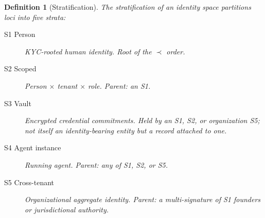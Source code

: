 \documentclass[11pt,a4paper,parskip=half-,DIV=12,headings=standardclasses]{scrartcl}
\theoremstyle{ncthm}
\theoremstyle{ncdef}
\newtheorem{definition}[theorem]{Definition}
\begin{document}
\begin{definition}[Stratification]\label{def:stratification}
The \emph{stratification} of an identity space partitions loci into
five strata:
\begin{description}
\item[S1 Person] KYC-rooted human identity. Root of the $\prec$ order.
\item[S2 Scoped] Person $\times$ tenant $\times$ role. Parent: an S1.
\item[S3 Vault] Encrypted credential commitments. Held by an S1, S2,
  or organization S5; not itself an identity-bearing entity but a
  record attached to one.
\item[S4 Agent instance] Running agent. Parent: any of S1, S2, or S5.
\item[S5 Cross-tenant] Organizational aggregate identity. Parent: a
  multi-signature of S1 founders or jurisdictional authority.
\end{description}
\end{definition}
\end{document}
